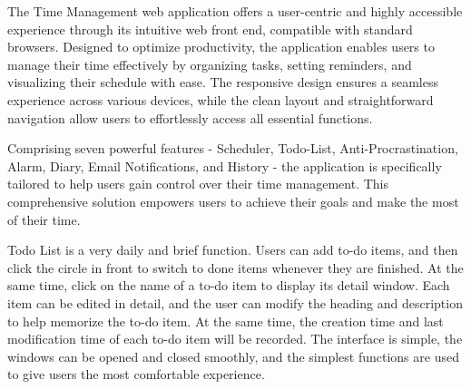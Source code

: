 \documentclass[a4paper]{article}
\begin{document}
The Time Management web application offers a user-centric and highly accessible experience through its intuitive web front end, compatible with standard browsers. Designed to optimize productivity, the application enables users to manage their time effectively by organizing tasks, setting reminders, and visualizing their schedule with ease. The responsive design ensures a seamless experience across various devices, while the clean layout and straightforward navigation allow users to effortlessly access all essential functions.

Comprising seven powerful features - Scheduler, Todo-List, Anti-Procrastination, Alarm, Diary, Email Notifications, and History - the application is specifically tailored to help users gain control over their time management. This comprehensive solution empowers users to achieve their goals and make the most of their time.

Todo List is a very daily and brief function. Users can add to-do items, and then click the circle in front to switch to done items whenever they are finished. At the same time, click on the name of a to-do item to display its detail window. Each item can be edited in detail, and the user can modify the heading and description to help memorize the to-do item. At the same time, the creation time and last modification time of each to-do item will be recorded. The interface is simple, the windows can be opened and closed smoothly, and the simplest functions are used to give users the most comfortable experience.
\end{document}
